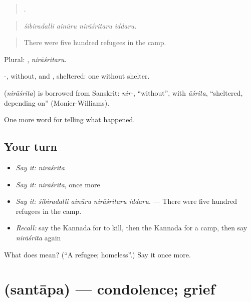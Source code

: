 \begin{quote}
   .
\end{quote}

\begin{quote}
\emph{śibiradalli ainūru nirāśritaru iddaru.}
\end{quote}

\begin{quote}
There were five hundred refugees in the camp.
\end{quote}

Plural: , \emph{nirāśritaru}.

-, without, and , sheltered: one without shelter.

\begin{cousinweb}
\textbf{} (\emph{nirāśrita}) is borrowed from Sanskrit: \emph{nir-}, \textquotedblleft{}without\textquotedblright{}, with \emph{āśrita}, \textquotedblleft{}sheltered, depending on\textquotedblright{} (Monier-Williams).
\end{cousinweb}

\begin{grammarlens}[title={What you've built}]
One more word for telling what happened.
\end{grammarlens}

\subsection*{Your turn}
\begin{itemize}
\raggedright
  \item \emph{Say it:} \emph{nirāśrita}
  \item \emph{Say it:} \emph{nirāśrita}, once more
  \item \emph{Say it:} \emph{śibiradalli ainūru nirāśritaru iddaru.} — There were five hundred refugees in the camp.
  \item \emph{Recall:} say the Kannada for to kill, then the Kannada for a camp, then say \emph{nirāśrita} again
\end{itemize}

\begin{tcolorbox}[breakable,colback=teal!4,colframe=teal!35!black,title={Before you move on}]
What does  mean? (\textquotedblleft{}A refugee; homeless\textquotedblright{}.) Say it once more.
\end{tcolorbox}
\section[\texorpdfstring{\kn{ಸಂತಾಪ} (santāpa)}{ಸಂತಾಪ (santāpa)}]{ (santāpa) — condolence; grief}

